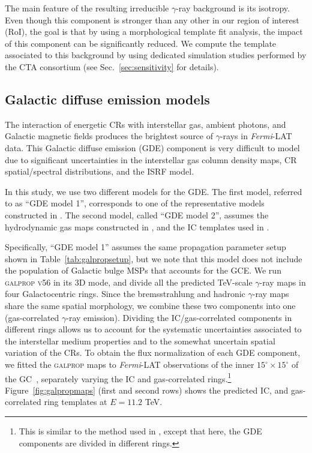 \documentclass[doublespace,nopageskip]{VTthesis} %
\begin{document}
The main feature of the resulting irreducible $\gamma$-ray background is its isotropy. Even though this component is stronger than any other in our region of interest (RoI), the goal is that by using a morphological template fit analysis, the impact of this component can be significantly reduced. We compute the template associated to this background by using dedicated simulation studies performed by the CTA consortium (see Sec.~\ref{sec:sensitivity} for details). 


\subsection{Galactic diffuse emission models}
\label{subsec:GDEmodels}

The interaction of energetic CRs with interstellar gas, ambient photons, and Galactic magnetic fields produces the brightest source of $\gamma$-rays in \textit{Fermi}-LAT data. This Galactic diffuse emission (GDE) component is very difficult to model due to significant uncertainties in the interstellar gas column density maps, CR spatial/spectral distributions, and the ISRF model.   

In this study, we use two different models for the GDE. The first model, referred to as ``GDE model 1'', corresponds to one of the representative models constructed in \cite{Johannesson:2018bit}. The second model, called ``GDE model 2'', assumes the hydrodynamic gas maps constructed in \cite{Macias:2016nev}, and the IC templates used in \cite{Abazajian:2020tww}.     

Specifically, ``GDE model 1'' assumes the same propagation parameter setup shown in Table~\ref{tab:galpropsetup}, but we note that this model does not include the population of Galactic bulge MSPs that accounts for the GCE. We run \textsc{galprop v56} in its 3D mode, and divide all the predicted TeV-scale $\gamma$-ray maps in four Galactocentric rings. Since the bremsstrahlung and hadronic $\gamma$-ray maps share the same spatial morphology, we combine these two components into one (gas-correlated $\gamma$-ray emission). Dividing the IC/gas-correlated components in different rings allows us to account for the systematic uncertainties associated to the interstellar medium properties and to the somewhat uncertain spatial variation of the CRs. 
To obtain the flux normalization of each GDE component, we fitted the \textsc{galprop} maps to \textit{Fermi}-LAT observations of the inner $15^\circ \times 15^\circ$ of the GC~\citep{Macias:2016nev}, separately varying the IC and gas-correlated rings.\footnote{This is similar to the method used in \cite{Rinchiuso:2020skh}, except that here, the GDE components are divided in different rings.} Figure~\ref{fig:galpropmaps} (first and second rows) shows the predicted IC, and gas-correlated ring templates at $E=11.2$ TeV. 
\end{document}

